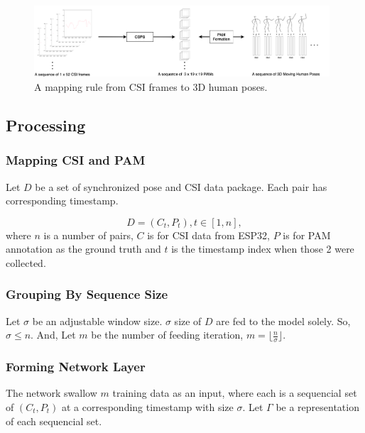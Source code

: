 \documentclass[10pt,letterpaper]{article}
\begin{document}
	\begin{figure}[htbp]
		\centerline{\includegraphics[width=110mm,scale=0.5]{STEP06.png}}
		\caption{A mapping rule from CSI frames to 3D human poses.}
		\label{fig:STEP01}
	\end{figure}
	
	
	
	\subsection*{Processing}
	
	
	\subsubsection*{Mapping CSI and PAM}
	Let $D$ be a set of synchronized pose and CSI data package. Each pair has corresponding timestamp.
	
	\begin{equation}
	D =  {(C_t, P_t), t \in [1, n]},
	\label{eq:Dataset}
	\end{equation} where  $n$ is a number of pairs, $C$ is for CSI data from ESP32, $P$ is for PAM annotation as the ground truth and $t$ is the timestamp index when those 2 were collected.
	
	
	
	\subsubsection*{Grouping By Sequence Size}
	
	Let $\sigma$ be an adjustable window size. $\sigma$ size of $D$ are fed to the model solely. So,  $\sigma \le n$. And, Let $m$ be the number of feeding iteration, $m = \lfloor \frac{n}{\sigma} \rfloor$.
	
	
	\subsubsection*{Forming Network Layer}
	
	The network swallow $m$ training data as an input, where each is a sequencial set of $(C_t,P_t)$ at a corresponding timestamp with size $\sigma$.
	Let $\Gamma$ be a representation of each sequencial set.
	
\end{document}
